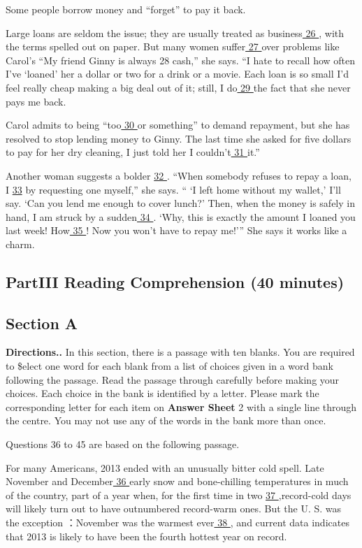 \documentclass[UTF8,11pt]{ctexart}
\begin{document}
Some people borrow money and “forget” to pay it back.


Large loans are seldom the issue; they are usually treated as business\uline{ 26 }, with the terms spelled out on paper. But many women suffer\uline{ 27 }over problems like Carol’s “My friend Ginny is always 28 cash,” she says. “I hate to recall how often I’ve ‘loaned’ her a dollar or two for a drink or a movie. Each loan is so small I’d feel really cheap making a big deal out of it; still, I do\uline{ 29 }the fact that she never pays me back.


Carol admits to being “too\uline{ 30 }or something” to demand repayment, but she has resolved to stop lending money to Ginny. The last time she asked for five dollars to pay for her dry cleaning, I just told her I couldn’t\uline{ 31 }it.”


Another woman suggests a bolder \uline{32 }. “When somebody refuses to repay a loan, I \uline{33} by requesting one myself,” she says. “ ‘I left home without my wallet,’ I’ll say. ‘Can you lend me enough to cover lunch?’ Then, when the money is safely in hand, I am struck by a sudden\uline{ 34 }. ‘Why, this is exactly the amount I loaned you last week! How\uline{ 35 }! Now you won’t have to repay me!’” She says it works like a charm.


\subsection*{\textbf{Part}III \textbf{Reading Comprehension} \textbf{(40 minutes)}}


\subsection*{\textbf{Section A}}


\textbf{Directions..} In this section, there is a passage with ten blanks. You are required to \$elect one word for each blank from a list of choices given in a word bank following the passage. Read the passage through carefully before making your choices. Each choice in the bank is identified by a letter. Please mark the corresponding letter for each item on \textbf{Answer Sheet} 2 with a single line through the centre. You may not use any of the words in the bank more than once.


Questions 36 to 45 are based on the following passage.


For many Americans, 2013 ended with an unusually bitter cold spell. Late November and December\uline{ 36 }early snow and bone-chilling temperatures in much of the country, part of a year when, for the first time in two \uline{37 },record-cold days will likely turn out to have outnumbered record-warm ones. But the U. S. was the exception ：November was the warmest ever\uline{ 38 }, and current data indicates that 2013 is likely to have been the fourth hottest year on record.
\end{document}
